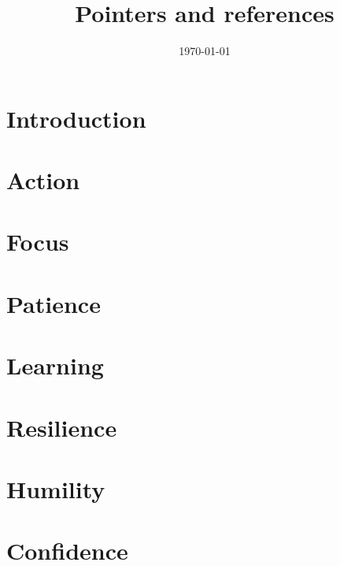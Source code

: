 \documentclass{book}
\title{Pointers and references}
\author{}
\date{\duration\today}
\begin{document}
\maketitle{}

\chapter{Introduction}


\cleartorightpage


\chapter{Action}


\chapter{Focus}


\chapter{Patience}


\chapter{Learning}


\chapter{Resilience}


\chapter{Humility}


\chapter{Confidence}

\end{document}
